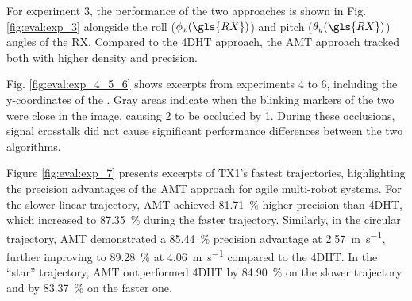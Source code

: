 \documentclass[lettersize,preprint]{elsarticle}
\begin{document}
For experiment 3, the performance of the two approaches is shown in Fig. \ref{fig:eval:exp_3} alongside the roll ($\phi_x(\gls{RX})$) and pitch ($\theta_y(\gls{RX})$) angles of the \gls{RX}.
Compared to the \gls{4DHT} approach, the \gls{AMT} approach tracked both  with higher density and precision.

Fig. \ref{fig:eval:exp_4_5_6} shows excerpts from experiments 4 to 6, including the y-coordinates of the .
Gray areas indicate when the blinking markers of the two  were close in the image, causing 2 to be occluded by 1.
During these occlusions, signal crosstalk did not cause significant performance differences between the two algorithms.

Figure \ref{fig:eval:exp_7} presents excerpts of \gls{TX}1's fastest trajectories, highlighting the precision advantages of the \gls{AMT} approach for agile multi-robot systems.
For the slower linear trajectory, \gls{AMT} achieved \SI{81.71}{\percent} higher precision than \gls{4DHT}, which increased to \SI{87.35}{\percent} during the faster trajectory.
Similarly, in the circular trajectory, \gls{AMT} demonstrated a \SI{85.44}{\percent} precision advantage at \SI{2.57}{\meter\per\second}, further improving to \SI{89.28}{\percent} at \SI{4.06}{\meter\per\second} compared to the \gls{4DHT}.
In the \enquote{star} trajectory, \gls{AMT} outperformed \gls{4DHT} by \SI{84.90}{\percent} on the slower trajectory and by \SI{83.37}{\percent} on the faster one.
\end{document}
